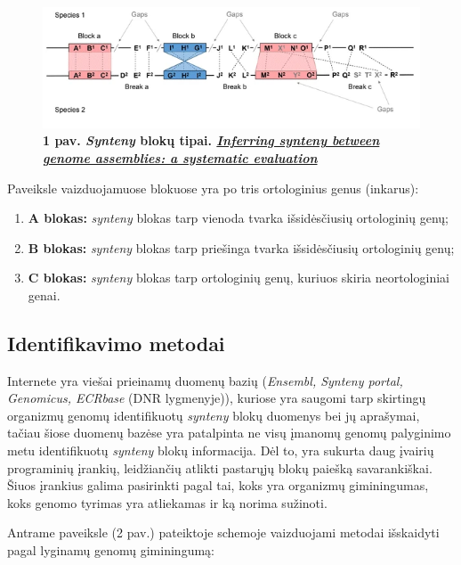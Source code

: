\documentclass[12pt]{article}
\begin{document}
\begin{figure}[htb]
    \begin{center}
        \includegraphics[width=0.7\linewidth]{../Figures/Synteny_blocks.png}
        \vspace{-2\baselineskip}
        \caption*{\small\textbf{1 pav. \emph{Synteny} blokų tipai.
        \href{https://bmcbioinformatics.biomedcentral.com/articles/\
        10.1186/s12859-018-2026-4}{\emph{Inferring synteny between genome assemblies:
        a systematic evaluation}}}}
        \label{fig:birds}
    \end{center}
\end{figure}

Paveiksle vaizduojamuose blokuose yra po tris ortologinius genus (inkarus):
\begin{enumerate}
    \item \textbf{A blokas:} \emph{synteny} blokas tarp vienoda tvarka
    išsidėsčiusių ortologinių genų;
    \item \textbf{B blokas:} \emph{synteny} blokas tarp priešinga tvarka
    išsidėsčiusių ortologinių genų;
    \item \textbf{C blokas:} \emph{synteny} blokas tarp ortologinių genų,
    kuriuos skiria neortologiniai genai.
\end{enumerate}

\subsection{Identifikavimo metodai}
Internete yra viešai prieinamų duomenų bazių (\emph{Ensembl, Synteny portal, 
Genomicus, ECRbase} (DNR lygmenyje)), kuriose yra saugomi tarp
skirtingų organizmų genomų identifikuotų \emph{synteny} blokų duomenys bei
jų aprašymai, tačiau šiose duomenų bazėse yra patalpinta ne visų įmanomų genomų
palyginimo metu identifikuotų \emph{synteny} blokų informacija. Dėl to, yra
sukurta daug įvairių programinių įrankių, leidžiančių atlikti pastarųjų blokų
paiešką savarankiškai. Šiuos įrankius galima pasirinkti pagal tai, koks yra
organizmų giminingumas, koks genomo tyrimas yra atliekamas ir ką norima
sužinoti.

Antrame paveiksle (2 pav.) pateiktoje schemoje vaizduojami metodai išskaidyti
pagal lyginamų genomų giminingumą:
\end{document}
